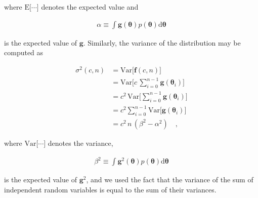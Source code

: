 \documentclass[modern,linenumbers]{aastex62}
\begin{document}
%
where $\mathrm{E}\big[\cdots\big]$ denotes the expected value and
%
\begin{linenomath}\begin{align}
        \alpha \equiv \int \mathbf{g} (\pmb{\theta}) p(\pmb{\theta}) \mathrm{d} \pmb{\theta}
    \end{align}\end{linenomath}
%
is the expected value of $\mathbf{g}$.
%
Similarly, the variance of the distribution may be computed as
%
\begin{linenomath}\begin{align}
        \sigma^2(c, n) & = \mathrm{Var} \Big[ \mathbf{f}(c, n) \Big] \nonumber                         \nonumber \\
                       & = \mathrm{Var} \Big[ c \, \sum_{i=0}^{n-1} \mathbf{g}(\pmb{\theta}_i) \Big]   \nonumber \\
                       & = c^2 \, \mathrm{Var} \Big[ \sum_{i=0}^{n-1} \mathbf{g}(\pmb{\theta}_i) \Big] \nonumber \\
                       & = c^2 \sum_{i=0}^{n-1} \mathrm{Var} \Big[  \mathbf{g}(\pmb{\theta}_i) \Big]   \nonumber \\
                       & = c^2 \, n \, (\beta^2 - \alpha^2)
        \quad,
    \end{align}\end{linenomath}
%
where $\mathrm{Var}\big[\cdots\big]$ denotes the variance,
%
\begin{linenomath}\begin{align}
        \beta^2 \equiv \int \mathbf{g}^2 (\pmb{\theta}) p(\pmb{\theta}) \mathrm{d} \pmb{\theta}
    \end{align}\end{linenomath}
%
is the expected value of $\mathbf{g}^2$, and we used the fact that the variance
of the sum of independent random variables is equal to the sum of their variances.

%
\end{document}
